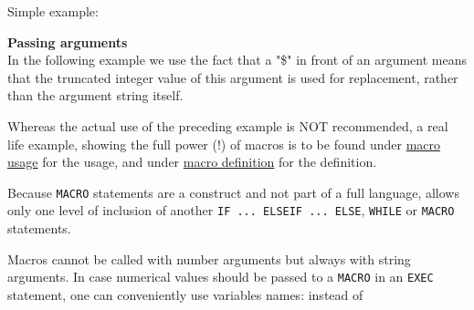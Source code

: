 Simple example: 


{\bf Passing arguments}\\
In the following example we use the fact that a "\$" in front of an
argument means that the truncated integer value of this argument is used
for replacement, rather than the argument string itself.  


Whereas the actual use of the preceding example is NOT recommended,
a real life example, showing the full power (!) of macros is to be
found under \href{foot.html}{macro usage} for the usage, and
under \href{foot.html#macro}{macro definition} for the
definition.


Because \texttt{MACRO} statements are a \madx
construct and not part of a full language, \madx  allows only one level
of inclusion of another \texttt{IF ... ELSEIF ... ELSE}, \texttt{WHILE}
or \texttt{MACRO} statements.  


Macros cannot be called with number arguments but always with string
arguments. In case numerical values should be passed to a \texttt{MACRO} in an
\texttt{EXEC} statement, one can conveniently use variables names: 
instead of 




